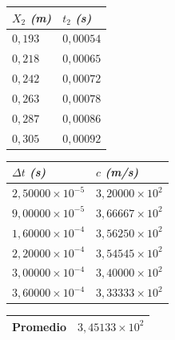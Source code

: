 \documentclass[twocolumn, 12pt]{article}
\newcommand{\bolditalic}[1]{\textbf{\textit{#1}}}
\begin{document}
\begin{table}[H]
    \begin{center}
        \begin{tabularx}{.9\linewidth}{|>{\centering\arraybackslash}X|>{\centering\arraybackslash}X|}
            \hline
            $X_{2}$ \bolditalic{(m)} & $t_{2}$ \bolditalic{(s)} \\\hline
            $0,193$                  & $0,00054$                \\\hline
            $0,218$                  & $0,00065$                \\\hline
            $0,242$                  & $0,00072$                \\\hline
            $0,263$                  & $0,00078$                \\\hline
            $0,287$                  & $0,00086$                \\\hline
            $0,305$                  & $0,00092$                \\\hline
        \end{tabularx}
    \end{center}
\end{table}

\begin{table}[H]
    \begin{center}
        \begin{tabularx}{.9\linewidth}{|>{\centering\arraybackslash}X|>{\centering\arraybackslash}X|}
            \hline
            $\Delta t$ \bolditalic{(s)} & $c$ \bolditalic{(m/s)}  \\\hline
            $2,50000 \times 10^{-5}$    & $3,20000 \times 10^{2}$ \\\hline
            $9,00000 \times 10^{-5}$    & $3,66667 \times 10^{2}$ \\\hline
            $1,60000 \times 10^{-4}$    & $3,56250 \times 10^{2}$ \\\hline
            $2,20000 \times 10^{-4}$    & $3,54545 \times 10^{2}$ \\\hline
            $3,00000 \times 10^{-4}$    & $3,40000 \times 10^{2}$ \\\hline
            $3,60000 \times 10^{-4}$    & $3,33333 \times 10^{2}$ \\\hline
        \end{tabularx}
    \end{center}
\end{table}

\begin{table}[H]
    \begin{center}
        \begin{tabularx}{.9\linewidth}{|>{\centering\arraybackslash}X|>{\centering\arraybackslash}X|}
            \hline
            Promedio & $3,45133 \times 10^{2}$ \\\hline
        \end{tabularx}
    \end{center}
\end{table}
\end{document}
